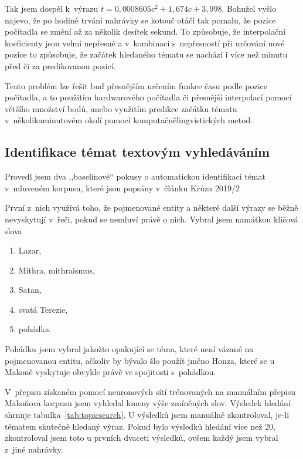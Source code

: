 Tak jsem dospěl k~výrazu $t = 0,0008605c^2 + 1,674c + 3,998$. Bohužel vyšlo
najevo, že po hodině trvání nahrávky se kotouč otáčí tak pomalu, že pozice
počítadla se změní až za několik desítek sekund. To způsobuje, že interpolační
koeficienty jsou velmi nepřesné a v~kombinaci s~nepřesností při určování nové
pozice to způsobuje, že začátek hledaného tématu se nachází i více než minutu
před či za predikovanou pozicí.

Tento problém lze řešit buď přesnějším určením funkce času podle pozice
počítadla, a to použitím hardwarového počítadla či přesnější interpolací
pomocí většího množství bodů, anebo využitím predikce začátku
tématu v~několikaminutovém okolí pomocí komputačnělingvistických metod.

\subsection{Identifikace témat textovým vyhledáváním}
\label{ssec:data:topicsearch}

Provedl jsem dva ,,baselinové`` pokusy o automatickou identifikaci témat
v~mluveném korpusu, které jsou popsány v~článku Krůza 2019/2\cite{kruza2019spoken}

První z~nich využívá toho, že pojmenované entity a některé další výrazy se běžně
nevyskytují v~řeči, pokud se nemluví právě o nich. Vybral jsem namátkou klíčová
slova
\begin{enumerate}
\item{Lazar,}
\item{Mithra, mithraismus,}
\item{Satan,}
\item{svatá Terezie,}
\item{pohádka.}
\end{enumerate}

Pohádku jsem vybral jakožto opakující se téma, které není vázané na pojmenovanou
entitu, ačkoliv by bývalo šlo použít jméno Honza, které se u Makoně vyskytuje
obvykle právě ve spojitosti s~pohádkou.

V~přepisu %
získaném pomocí neuronových sítí trénovaných na manuálním přepisu Makoňova korpusu jsem vyhledal kmeny
výše zmíněných slov. Výsledek hledání shrnuje tabulka~\ref{tab:topicsearch}.
U výsledků jsem manuálně zkontroloval, je-li tématem skutečně hledaný výraz.
Pokud bylo výsledků hledání více než 20, zkontroloval jsem toto u prvních
dvaceti výsledků, ovšem každý jsem vybral z~jiné nahrávky.


